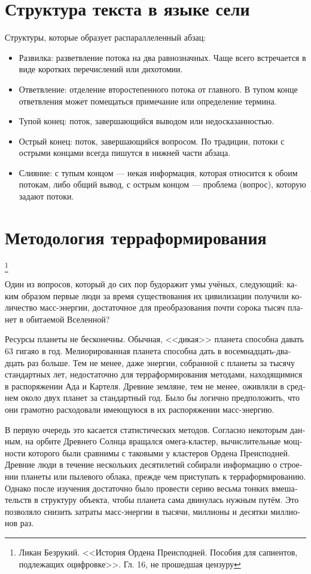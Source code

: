 \documentclass[a4paper,12pt,fleqn]{book}\usepackage{polyglossia}\setdefaultlanguage[babelshorthands=true]{russian}\setotherlanguage{english}\defaultfontfeatures{Ligatures=TeX,Mapping=tex-text}\usepackage{xcolor}\newcommand{\ml}[3]{#2}
\begin{document}
{\section{Структура текста в языке сели}

Структуры, которые образует распараллеленный абзац:

\begin{itemize}
\item Развилка: разветвление потока на два равнозначных.
Чаще всего встречается в виде коротких перечислений или дихотомии.
\item Ответвление: отделение второстепенного потока от главного.
В тупом конце ответвления может помещаться примечание или определение термина.
\item Тупой конец: поток, завершающийся выводом или недосказанностью.
\item Острый конец: поток, завершающийся вопросом. По традиции, потоки с острыми концами всегда пишутся в нижней части абзаца.
\item Слияние: с тупым концом --- некая информация, которая относится к обоим потокам, либо общий вывод, с острым концом --- проблема (вопрос), которую задают потоки.
\end{itemize}

\section{Методология терраформирования}

\footnote{Ликан Безрукий. <<История Ордена Преисподней. Пособия для сапиентов, подлежащих оцифровке>>. Гл. 16, не прошедшая цензуру}

Один из вопросов, который до сих пор будоражит умы учёных, следующий: каким образом первые люди за время существования их цивилизации получили количество масс-энергии, достаточное для преобразования почти сорока тысяч планет в обитаемой Вселенной?

Ресурсы планеты не бесконечны.
Обычная, <<дикая>> планета способна давать 63 гигаяо в год.
Мелиорированная планета способна дать в восемнадцать-двадцать раз больше.
Тем не менее, даже энергии, собранной с планеты за тысячу стандартных лет, недостаточно для терраформирования методами, находящимися в распоряжении Ада и Картеля.
Древние земляне, тем не менее, оживляли в среднем около двух планет за стандартный год.
Было бы логично предположить, что они грамотно расходовали имеющуюся в их распоряжении масс-энергию.

В первую очередь это касается статистических методов.
Согласно некоторым данным, на орбите Древнего Солнца вращался омега-кластер, вычислительные мощности которого были сравнимы с таковыми у кластеров Ордена Преисподней.
Древние люди в течение нескольких десятилетий собирали информацию о строении планеты или пылевого облака, прежде чем приступать к терраформированию.
Однако после изучения достаточно было провести серию весьма тонких вмешательств в структуру объекта, чтобы планета сама двинулась нужным путём.
Это позволяло снизить затраты масс-энергии в тысячи, миллионы и десятки миллионов раз.

}
\end{document}

